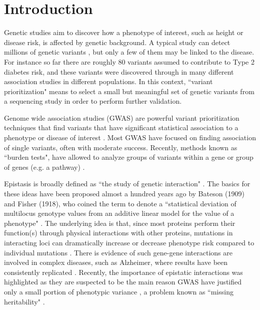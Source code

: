 \section{Introduction}

Genetic studies aim to discover how a phenotype of interest, such as height or disease risk, is affected by genetic background. A typical study can detect millions of genetic variants \cite{clarke2011basic}, but only a few of them may be linked to the disease. For instance so far there are roughly 80 variants assumed to contribute to Type 2 diabetes risk, and these variants were discovered through in many different association studies in different populations. In this context, ``variant prioritization" means to select a small but meaningful set of genetic variants from a sequencing study in order to perform further validation. 

Genome wide association studies (GWAS) are powerful variant prioritization techniques that find variants that have significant statistical association to a phenotype or disease of interest \cite{visscher2012five}. Most GWAS have focused on finding association of single variants, often with moderate success. Recently, methods known as ``burden tests", have allowed to analyze groups of variants within a gene or group of genes (e.g. a pathway) \cite{wu2011rare}.

Epistasis is broadly defined as ``the study of genetic interaction" \cite{gao2010classification}. The basics for these ideas have been proposed almost a hundred years ago by Bateson (1909) and Fisher (1918), who coined the term to denote a ``statistical deviation of multilocus genotype values from an additive linear model for the value of a phenotype" \cite{gao2010classification}. The underlying idea is that, since most proteins perform their function(s) through physical interactions with other proteins, mutations in interacting loci can dramatically increase or decrease phenotype risk compared to individual mutations \cite{cantor2010prioritizing}. There is evidence of such gene-gene interactions are involved in complex diseases, such as Alzheimer, where results have been consistently replicated \cite{combarros2009epistasis}. Recently, the importance of epistatic interactions was highlighted as they are suspected to be the main reason GWAS have justified only a small portion of phenotypic variance \cite{zuk2012mystery}, a problem known as ``missing heritability" \cite{manolio2009finding}. 

